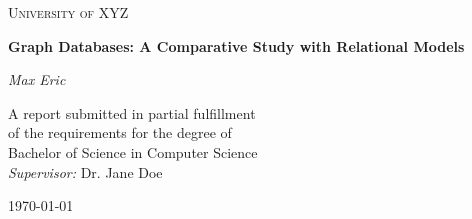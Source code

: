 
\begin{titlepage}
    \centering
    {\scshape\LARGE University of XYZ \par} %
    \vspace{1.5cm}
    {\huge\bfseries Graph Databases: A Comparative Study with Relational Models \par} %
    \vspace{2cm}
    {\Large\itshape Max Eric \par} %
    \vfill
    A report submitted in partial fulfillment\\
    of the requirements for the degree of\\
    Bachelor of Science in Computer Science\\
    \vspace{0.8cm}
    \textit{Supervisor:} Dr. Jane Doe\\ %
    \vspace{0.8cm}
    {\large \today\par} %
\end{titlepage}

